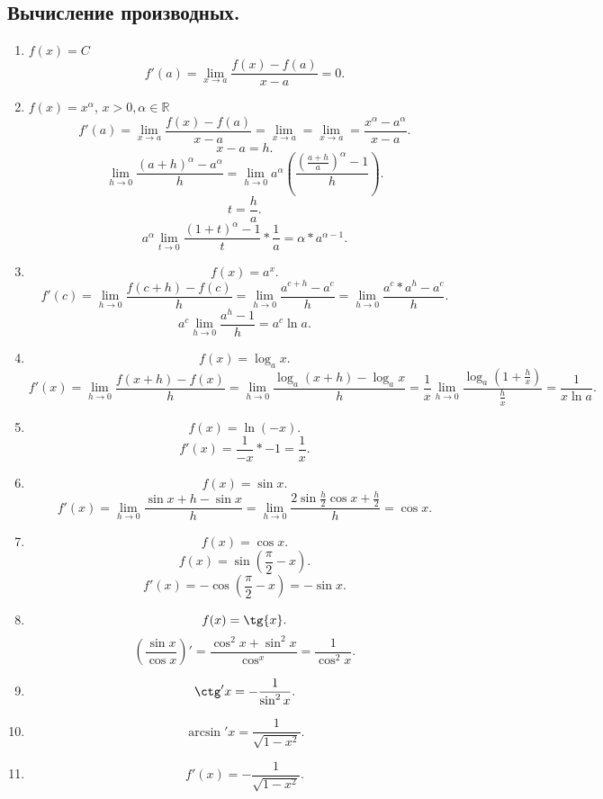 \documentclass[a4paper]{article}
\begin{document}
\subsection{Вычисление производных.}
\begin{enumerate}
	\item $f(x) = C $
	      \[
		      f'(a) = \lim_{x \to a} \frac{f(x) - f(a)}{x - a} = 0
		      .\]
	\item
	      $f(x) = x^\alpha$,  $x > 0, \alpha \in \mathbb{R}$
	      \[
		      f'(a) = \lim_{x \to a} \frac{f(x) - f(a)}{x -a} = \lim_{x \to a} =
		      \lim_{x \to a} = \frac{x^\alpha - a^\alpha}{x - a}
		      .\]
	      \[
		      x - a = h
		      .\]
	      \[
		      \lim_{h \to 0} \frac{(a + h)^\alpha - a^\alpha}{h} = \lim_{h \to 0} a^{\alpha} (\frac{(\frac{a + h}{a})^{\alpha} - 1}{h})
		      .\]
	      \[
		      t = \frac{h}{a}
		      .\]
	      \[
		      a^{\alpha} \lim_{t \to 0} \frac{(1 + t)^\alpha - 1}{t} * \frac{1}{a} = \alpha*a^{\alpha - 1}
		      .\]
	\item
	      \[
		      f(x) = a^x
		      .\]
	      \[
		      f'(c) = \lim_{h \to 0} \frac{f(c + h) - f(c)}{h} = \lim_{h \to 0} \frac{a^{c + h} - a^c}{h} = \lim_{h \to 0} \frac{a^c*a^h - a^c}{h}
		      .\]
	      \[
		      a^c \lim_{h \to 0} \frac{a^h - 1}{h} = a^c \ln{a}
		      .\]
	\item
	      \[
		      f(x) = \log_a{x}
		      .\]
	      \[
		      f'(x) = \lim_{h \to 0} \frac{f(x + h) - f(x)}{h} = \lim_{h \to 0} \frac{\log_a(x+h) - \log_a{x}}{h} = \frac{1}{x} \lim_{h \to 0} \frac{\log_a{( 1 + \frac{h}{x} )}}{\frac{h}{x}} = \frac{1}{x\ln{a}}
		      .\]
	\item
	      \[
		      f(x) = \ln(-x)
		      .\]
	      \[
		      f'(x) = \frac{1}{-x}*-1 = \frac{1}{x}
		      .\]
	\item
	      \[
		      f(x) = \sin{x}
		      .\]
	      \[
		      f'(x) = \lim_{h \to 0} \frac{\sin{x + h} - \sin{x}}{h} =
		      \lim_{h \to 0} \frac{2\sin{\frac{h}{2}}\cos{x + \frac{h}{2}}}{h} = \cos{x}
		      .\]
	\item
	      \[
		      f(x) = \cos{x}
		      .\]
	      \[
		      f(x) = \sin{( \frac{\pi}{2} - x )}
		      .\]
	      \[
		      f'(x) =-\cos{(\frac{ \pi}{2} - x )} = -\sin{x}
		      .\]
	\item
	      \[
		      f(x) = \tg{x}
		      .\]
	      \[
		      (\frac{\sin{x}}{\cos{x}})' = \frac{\cos^2{x} + \sin^2{x}}{\cos^{x}} = \frac{1}{\cos^2{x}}
		      .\]
	\item
	      \[
		      \ctg'{x} = -\frac{1}{\sin^2{x}}
		      .\]
              \item
                  \[
                      \arcsin'{x} = \frac{1}{\sqrt{1 - x^2} }
                  .\] 
            \item
                \[
                f'(x) = - \frac{1}{\sqrt{1 - x^2} }
                .\] 
\end{enumerate}
\end{document}

